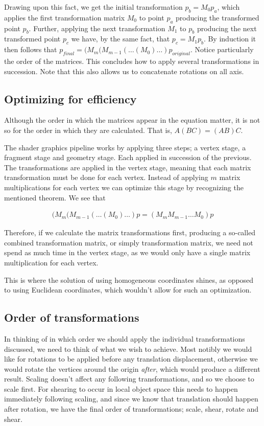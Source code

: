 \documentclass[11pt]{article}
\begin{document}
Drawing upon this fact, we get the initial transformation $p_b = M_0 p_a$,
which applies the first transformation matrix $M_0$ to point $p_a$ producing
the transformed point $p_b$. Further, applying the next transformation $M_1$
to $p_b$ producing the next transformed point $p_c$ we have, by the same fact,
that $p_c = M_1 p_b$. By induction it then follows that
$p_{final} = (M_m(M_{m-1}(\dots(M_0)\dots) p_{original}$. Notice particularly
the order of the matrices. This concludes how to apply several transformations
in succession. Note that this also allows us to concatenate rotations on all
axis.

\subsection{Optimizing for efficiency}
Although the order in which the matrices appear in the equation matter, it is
not so for the order in which they are calculated. That is, $A(BC) = (AB)C$.

The shader graphics pipeline works by applying three steps; a vertex stage,
a fragment stage and geometry stage. Each applied in succession of the
previous. The transformations are applied in the vertex stage, meaning that
each matrix transformation must be done for each vertex. Instead of applying
$m$ matrix multiplications for each vertex we can optimize this stage by
recognizing the mentioned theorem. We see that

\begin{align}
    (M_m(M_{m-1}(\dots(M_0)\dots) p = (M_m M_{m-1} \dots M_0) p
\end{align}

Therefore, if we calculate the matrix transformations first, producing a
so-called combined transformation matrix, or simply transformation matrix, we
need not spend as much time in the vertex stage, as we would only have a
single matrix multiplication for each vertex.

This is where the solution of using homogeneous coordinates shines, as
opposed to using Euclidean coordinates, which wouldn't allow for such an
optimization.

\newpage
\subsection{Order of transformations}
In thinking of in which order we should apply the individual transformations
discussed, we need to think of what we wish to achieve. Most notibly we would
like for rotations to be applied before any translation displacement,
otherwise we would rotate the vertices around the origin {\it after}, which
would produce a different result. Scaling doesn't affect any following
transformations, and so we choose to scale first. For shearing to occur in
local object space this needs to happen immediately following scaling, and
since we know that translation should happen after rotation, we have the
final order of transformations; scale, shear, rotate and shear.
\end{document}
